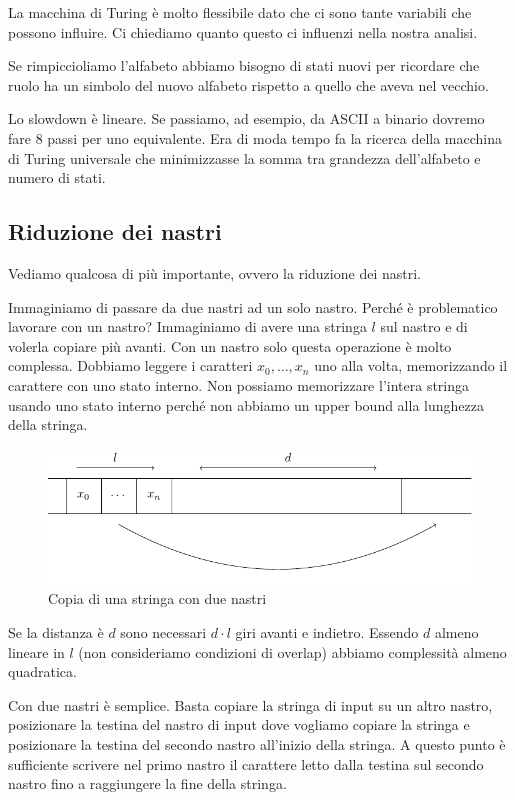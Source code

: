 La macchina di Turing è molto flessibile dato che ci sono tante variabili che possono influire. Ci
chiediamo quanto questo ci influenzi nella nostra analisi.

Se rimpiccioliamo l'alfabeto abbiamo bisogno di stati nuovi per ricordare che ruolo ha un simbolo del
nuovo alfabeto rispetto a quello che aveva nel vecchio.

Lo slowdown è lineare. Se passiamo, ad esempio, da ASCII a binario dovremo fare 8 passi per uno
equivalente. Era di moda tempo fa la ricerca della macchina di Turing universale che minimizzasse la
somma tra grandezza dell'alfabeto e numero di stati.


\subsection{Riduzione dei nastri}

Vediamo qualcosa di più importante, ovvero la riduzione dei nastri.

Immaginiamo di passare da due nastri ad un solo nastro. Perché è problematico lavorare con un
nastro? Immaginiamo di avere una stringa $l$ sul nastro e di volerla copiare più avanti. Con un
nastro solo questa operazione è molto complessa. Dobbiamo leggere i caratteri $x_{0},\dotsc,x_{n}$
uno alla volta, memorizzando il carattere con uno stato interno. Non possiamo memorizzare l'intera
stringa usando uno stato interno perché non abbiamo un upper bound alla lunghezza della stringa.

\begin{figure}[h]
    \begin{center}
        \includegraphics{img/CopyString.pdf}
        \caption{Copia di una stringa con due nastri}
    \end{center}
\end{figure}

Se la distanza è $d$ sono necessari $d\cdot l$ giri avanti e indietro. Essendo $d$ almeno lineare in $l$
(non consideriamo condizioni di overlap) abbiamo complessità almeno quadratica.

Con due nastri è semplice. Basta copiare la stringa di input su un altro nastro, posizionare la
testina del nastro di input dove vogliamo copiare la stringa e posizionare la testina del secondo
nastro all'inizio della stringa. A questo punto è sufficiente scrivere nel primo nastro il
carattere letto dalla testina sul secondo nastro fino a raggiungere la fine della stringa.

